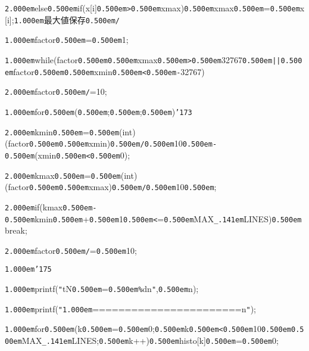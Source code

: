 \documentclass[uplatex,a4paper]{jsarticle}
\begin{document}
\noindent
{\tt\mc \kern2.000em}else{\tt\mc \kern0.500em}if(x[i]{\tt\mc \kern0.500em}{\tt >}{\tt\mc \kern0.500em}xmax){\tt\mc \kern0.500em}xmax{\tt\mc \kern0.500em}={\tt\mc \kern0.500em}x[i];{\tt\mc \kern1.000em}\rm\mc {\tt /}{\tt *}{\tt\mc \kern0.500em}最大値保存{\tt\mc \kern0.500em}{\tt *}{\tt /}\tt\mc 

\noindent
{\tt\mc \kern1.000em}factor{\tt\mc \kern0.500em}={\tt\mc \kern0.500em}1;

\noindent
{\tt\mc \kern1.000em}while(factor{\tt\mc \kern0.500em}{\tt *}{\tt\mc \kern0.500em}xmax{\tt\mc \kern0.500em}{\tt >}{\tt\mc \kern0.500em}32767{\tt\mc \kern0.500em}{\tt |}{\tt |}{\tt\mc \kern0.500em}factor{\tt\mc \kern0.500em}{\tt *}{\tt\mc \kern0.500em}xmin{\tt\mc \kern0.500em}{\tt <}{\tt\mc \kern0.500em}{\tt -}32767)

\noindent
{\tt\mc \kern2.000em}factor{\tt\mc \kern0.500em}{\tt /}=10;

\noindent
{\tt\mc \kern1.000em}for{\tt\mc \kern0.500em}({\tt\mc \kern0.500em};{\tt\mc \kern0.500em};{\tt\mc \kern0.500em}){\tt\char'173}

\noindent
{\tt\mc \kern2.000em}kmin{\tt\mc \kern0.500em}={\tt\mc \kern0.500em}(int)(factor{\tt\mc \kern0.500em}{\tt *}{\tt\mc \kern0.500em}xmin){\tt\mc \kern0.500em}{\tt /}{\tt\mc \kern0.500em}10{\tt\mc \kern0.500em}{\tt -}{\tt\mc \kern0.500em}(xmin{\tt\mc \kern0.500em}{\tt <}{\tt\mc \kern0.500em}0);

\noindent
{\tt\mc \kern2.000em}kmax{\tt\mc \kern0.500em}={\tt\mc \kern0.500em}(int)(factor{\tt\mc \kern0.500em}{\tt *}{\tt\mc \kern0.500em}xmax){\tt\mc \kern0.500em}{\tt /}{\tt\mc \kern0.500em}10{\tt\mc \kern0.500em};

\noindent
{\tt\mc \kern2.000em}if(kmax{\tt\mc \kern0.500em}{\tt -}{\tt\mc \kern0.500em}kmin{\tt\mc \kern0.500em}+{\tt\mc \kern0.500em}1{\tt\mc \kern0.500em}{\tt <}={\tt\mc \kern0.500em}MAX{\tt\_\kern.141em}LINES){\tt\mc \kern0.500em}break;

\noindent
{\tt\mc \kern2.000em}factor{\tt\mc \kern0.500em}{\tt /}={\tt\mc \kern0.500em}10;

\noindent
{\tt\mc \kern1.000em}{\tt\char'175}

\noindent
{\tt\mc \kern1.000em}printf({\tt "}{\tt{}}tN{\tt\mc \kern0.500em}={\tt\mc \kern0.500em}{\tt\%}d{\tt{}}n{\tt "},{\tt\mc \kern0.500em}n);

\noindent
{\tt\mc \kern1.000em}printf({\tt "}{\tt\mc \kern1.000em}======================={\tt{}}n{\tt "});

\noindent
{\tt\mc \kern1.000em}for{\tt\mc \kern0.500em}(k{\tt\mc \kern0.500em}={\tt\mc \kern0.500em}0;{\tt\mc \kern0.500em}k{\tt\mc \kern0.500em}{\tt <}{\tt\mc \kern0.500em}10{\tt\mc \kern0.500em}{\tt *}{\tt\mc \kern0.500em}MAX{\tt\_\kern.141em}LINES;{\tt\mc \kern0.500em}k++){\tt\mc \kern0.500em}histo[k]{\tt\mc \kern0.500em}={\tt\mc \kern0.500em}0;
\end{document}
